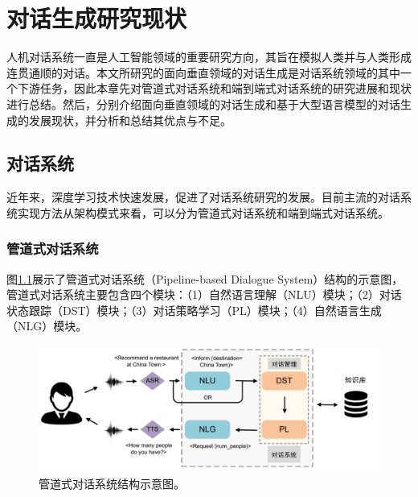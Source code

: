\chapter{对话生成研究现状}

人机对话系统一直是人工智能领域的重要研究方向，其旨在模拟人类并与人类形成连贯通顺的对话。本文所研究的面向垂直领域的对话生成是对话系统领域的其中一个下游任务，因此本章先对管道式对话系统和端到端式对话系统的研究进展和现状进行总结。然后，分别介绍面向垂直领域的对话生成和基于大型语言模型的对话生成的发展现状，并分析和总结其优点与不足。

\section{对话系统}

近年来，深度学习技术快速发展，促进了对话系统研究的发展\cite{JSJX201907001}。目前主流的对话系统实现方法从架构模式来看，可以分为管道式对话系统和端到端式对话系统。

\subsection{管道式对话系统}

图\ref{pipeline_dialogue_system}展示了管道式对话系统（Pipeline-based Dialogue System）结构的示意图，管道式对话系统主要包含四个模块：（1）自然语言理解（NLU）模块；（2）对话状态跟踪（DST）模块；（3）对话策略学习（PL）模块；（4）自然语言生成（NLG）模块。

\begin{figure}[htbp]
	\centering
	\includegraphics[scale=0.55]{Fig/pipeline_dialogue_system.png}
	\caption{\label{pipeline_dialogue_system}管道式对话系统结构示意图\cite{DBLP:journals/air/NiYPXC23}。}
\end{figure}

